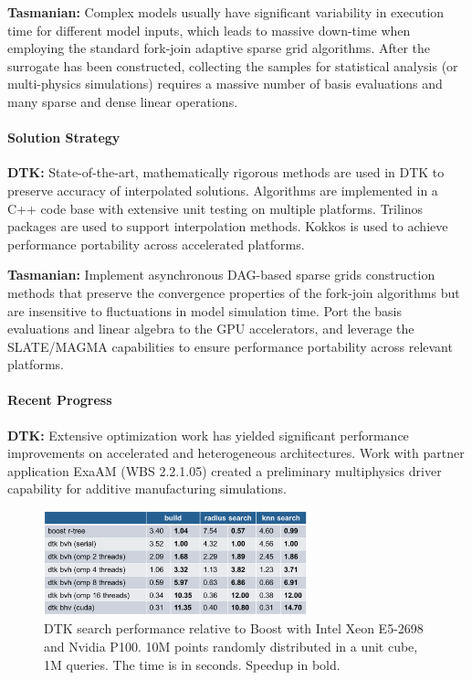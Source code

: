 {\bf Tasmanian:} Complex models usually have significant variability in
execution time for different model inputs, which leads to massive down-time
when employing the standard fork-join adaptive sparse grid algorithms.  After
the surrogate has been constructed, collecting the samples for statistical
analysis (or multi-physics simulations) requires a massive number of basis
evaluations and many sparse and dense linear operations.

\paragraph{Solution Strategy}

\nobreak


\indent

{\bf DTK:} State-of-the-art, mathematically rigorous methods are used in DTK
to preserve accuracy of interpolated solutions.  Algorithms are implemented in
a C++ code base with extensive unit testing on multiple platforms.  Trilinos
packages are used to support interpolation methods.  Kokkos is used to achieve
performance portability across accelerated platforms.

{\bf Tasmanian:} Implement asynchronous DAG-based sparse grids construction
methods that preserve the convergence properties of the fork-join algorithms
but are insensitive to fluctuations in model simulation time.  Port the basis
evaluations and linear algebra to the GPU accelerators, and leverage the
SLATE/MAGMA capabilities to ensure performance portability across relevant
platforms.



\paragraph{Recent Progress}

\indent

{\bf DTK:} Extensive optimization work has yielded significant performance
improvements on accelerated and heterogeneous architectures. Work with partner
application ExaAM (WBS 2.2.1.05) created a preliminary multiphysics driver
capability for additive manufacturing simulations.

\begin{figure}[htb]
        \centering
        \includegraphics[width=3.0in]{projects/2.3.3-MathLibs/2.3.3.11-ALExa/dtk-gpu}
        \caption{\label{fig:dtk-gpu}DTK search performance relative to Boost with Intel Xeon E5-2698 and Nvidia P100. 10M points randomly distributed in a unit cube, 1M queries. The time is in seconds. Speedup in bold.}
\end{figure}

